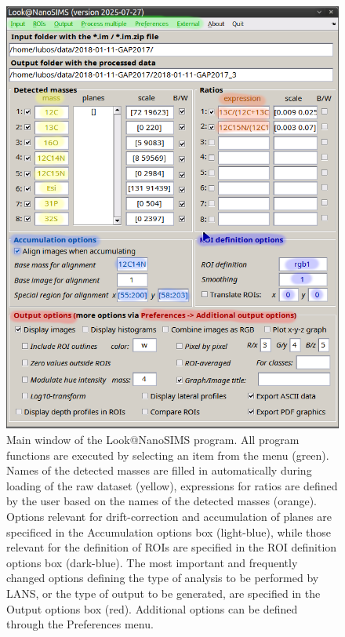 \begin{figure}[!t]
\centering
\includegraphics[scale=0.51]{figs1/LANS-maingui}
\caption{\label{fig1:mainLANSgui}%
Main window of the Look@NanoSIMS program. All program functions are executed by selecting an item from the menu (green). Names of the detected \textsf{masses} are filled in automatically during loading of the raw dataset (yellow), \textsf{expressions} for ratios are defined by the user based on the names of the detected masses (orange). Options relevant for drift-correction and accumulation of planes are specificed in the \textsf{Accumulation options} box (light-blue), while those relevant for the definition of ROIs are specified in the \textsf{ROI definition options} box (dark-blue). The most important and frequently changed options defining the {type of analysis} to be performed by LANS, or the {type of output} to be generated, are specified in the \textsf{Output options} box (red). Additional options can be defined through the \textsf{Preferences} menu.}
\end{figure}

